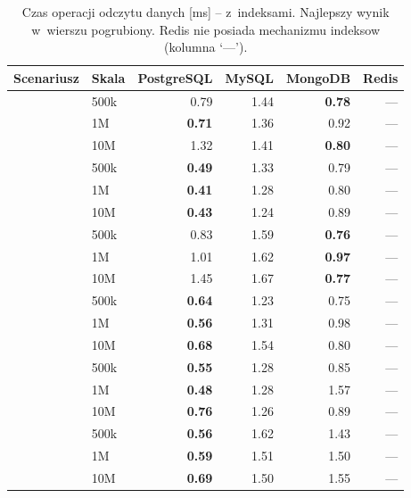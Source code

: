 \begin{table}[H]
\centering
\caption{Czas operacji odczytu danych [ms] -- z~indeksami. Najlepszy wynik w~wierszu pogrubiony. Redis nie posiada mechanizmu indeksow (kolumna `---').}
\label{tab:read_idx}
\small
\begin{tabular}{@{}llrrrr@{}}
\toprule
\textbf{Scenariusz} & \textbf{Skala} & \textbf{PostgreSQL} & \textbf{MySQL} & \textbf{MongoDB} & \textbf{Redis} \\
\midrule
{}
 & 500k & 0.79 & 1.44 & \textbf{0.78} & --- \\
 & 1M & \textbf{0.71} & 1.36 & 0.92 & --- \\
 & 10M & 1.32 & 1.41 & \textbf{0.80} & --- \\
\midrule
{}
 & 500k & \textbf{0.49} & 1.33 & 0.79 & --- \\
 & 1M & \textbf{0.41} & 1.28 & 0.80 & --- \\
 & 10M & \textbf{0.43} & 1.24 & 0.89 & --- \\
\midrule
{}
 & 500k & 0.83 & 1.59 & \textbf{0.76} & --- \\
 & 1M & 1.01 & 1.62 & \textbf{0.97} & --- \\
 & 10M & 1.45 & 1.67 & \textbf{0.77} & --- \\
\midrule
{}
 & 500k & \textbf{0.64} & 1.23 & 0.75 & --- \\
 & 1M & \textbf{0.56} & 1.31 & 0.98 & --- \\
 & 10M & \textbf{0.68} & 1.54 & 0.80 & --- \\
\midrule
{}
 & 500k & \textbf{0.55} & 1.28 & 0.85 & --- \\
 & 1M & \textbf{0.48} & 1.28 & 1.57 & --- \\
 & 10M & \textbf{0.76} & 1.26 & 0.89 & --- \\
\midrule
{}
 & 500k & \textbf{0.56} & 1.62 & 1.43 & --- \\
 & 1M & \textbf{0.59} & 1.51 & 1.50 & --- \\
 & 10M & \textbf{0.69} & 1.50 & 1.55 & --- \\
\bottomrule
\end{tabular}
\end{table}
